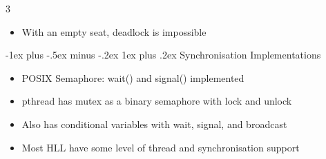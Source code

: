 \documentclass[10pt, landscape]{article}
\makeatletter
\renewcommand{\subsection}{\@startsection{subsection}{3}{0mm}%
                                {-1ex plus -.5ex minus -.2ex}%
                                {1ex plus .2ex}%
                                {\normalfont\small\bfseries}}%
\makeatother
\begin{document}
\begin{multicols*}{3}
\begin{itemize}
\begin{itemize}
\begin{verbatim}
            wait(s[i]);
        }
        void safeToEat(i) {
            if (state[i] == HUNGRY &&
                state[LEFT] != EATING &&
                state[RIGHT] != EATING) {
                state[i] = EATING;
                signal(s[i]);
            }
        }
        void putChpStcks(i) {
            wait(mutex);
            state[i] = THINKING;
            safeToEat(LEFT);
            safeToEat(RIGHT);
            signal(mutex);
        }
        \end{verbatim}
        \item With an empty seat, deadlock is impossible
    \end{itemize}
\end{itemize}

\subsection{Synchronisation Implementations}
\begin{itemize}
    \item POSIX Semaphore: wait() and signal() implemented
    \item pthread has mutex as a binary semaphore with lock and unlock
    \item Also has conditional variables with wait, signal, and broadcast
    \item Most HLL have some level of thread and synchronisation support
\end{itemize}

\end{multicols*}
\end{document}
